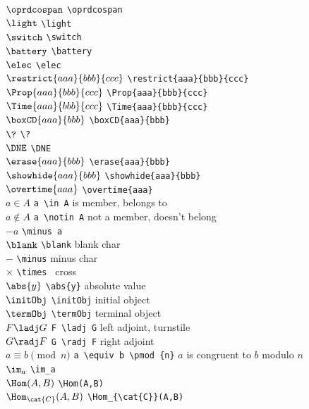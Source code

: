 \documentclass[11pt, book]{memoir}
\begin{document}
\begin{multicols}{2}
$\oprdcospan$ \verb|\oprdcospan| \\
$\light$ \verb|\light| \\
$\switch$ \verb|\switch| \\
$\battery$ \verb|\battery| \\
$\elec$ \verb|\elec| \\
$\restrict{aaa}{bbb}{ccc}$ \verb|\restrict{aaa}{bbb}{ccc}| \\
$\Prop{aaa}{bbb}{ccc}$ \verb|\Prop{aaa}{bbb}{ccc}| \\
$\Time{aaa}{bbb}{ccc}$ \verb|\Time{aaa}{bbb}{ccc}| \\
$\boxCD{aaa}{bbb}$ \verb|\boxCD{aaa}{bbb}| \\
$\?$ \verb|\?| \\
$\DNE$ \verb|\DNE| \\
$\erase{aaa}{bbb}$ \verb|\erase{aaa}{bbb}| \\
$\showhide{aaa}{bbb}$ \verb|\showhide{aaa}{bbb}| \\
$\overtime{aaa}$ \verb|\overtime{aaa}| \\
$a \in A$ \verb|a \in A| is member, belongs to \\
$a \notin A$ \verb|a \notin A| not a member, doesn't belong \\
$\minus a$ \verb|\minus a| \\
$\blank$ \verb|\blank| blank char \\
$\minus$ \verb|\minus| minus char \\
$\times $ \verb|\times | cross \\
$\abs{y}$ \verb|\abs{y}| absolute value \\
$\initObj$ \verb|\initObj| initial object \\
$\termObj$ \verb|\termObj| terminal object \\
$F \ladj G$ \verb|F \ladj G| left adjoint, turnstile \\
$G \radj F$ \verb|G \radj F| right adjoint \\
$a \equiv b \pmod {n}$ \verb|a \equiv b \pmod {n}| $a$ is congruent to $b$ modulo $n$ \\
$\im_a$ \verb|\im_a| \\
$\Hom(A,B)$ \verb|\Hom(A,B)| \\
$\Hom_{\cat{C}}(A,B)$ \verb|\Hom_{\cat{C}}(A,B)| \\

\end{multicols}
\end{document}
